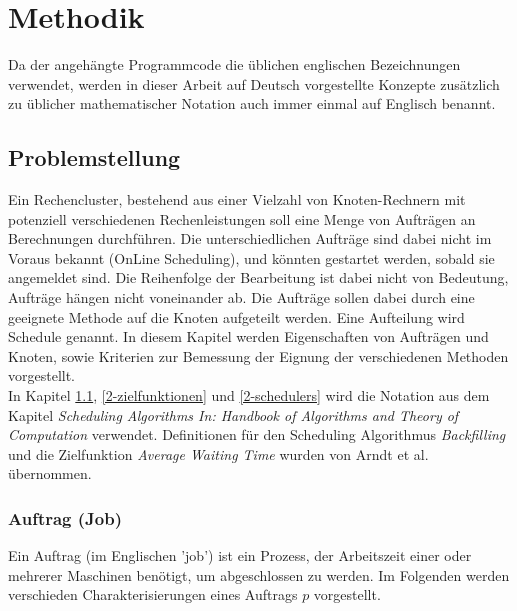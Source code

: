 \chapter{Methodik}
\label{chap:methodik}
Da der angehängte Programmcode die üblichen englischen Bezeichnungen verwendet, werden in dieser Arbeit auf Deutsch vorgestellte Konzepte zusätzlich zu üblicher mathematischer Notation auch immer einmal auf Englisch benannt.

\section{Problemstellung}
\label{2-problemstellung}

Ein Rechencluster, bestehend aus einer Vielzahl von Knoten-Rechnern mit potenziell verschiedenen Rechenleistungen soll eine Menge von Aufträgen an Berechnungen durchführen. Die unterschiedlichen Aufträge sind dabei nicht im Voraus bekannt (OnLine Scheduling), und könnten gestartet werden, sobald sie angemeldet sind. Die Reihenfolge der Bearbeitung ist dabei nicht von Bedeutung, Aufträge hängen nicht voneinander ab. Die Aufträge sollen dabei durch eine geeignete Methode auf die Knoten aufgeteilt werden. Eine Aufteilung wird Schedule genannt. In diesem Kapitel werden Eigenschaften von Aufträgen und Knoten, sowie Kriterien zur Bemessung der Eignung der verschiedenen Methoden vorgestellt.\\
In Kapitel \ref{2-problemstellung}, \ref{2-zielfunktionen} und \ref{2-schedulers} wird die Notation aus dem Kapitel \emph{Scheduling Algorithms In: Handbook of Algorithms and Theory of Computation} 
\cite[p.~7-21]{Kar97} verwendet. Definitionen für den Scheduling Algorithmus \emph{Backfilling} und die Zielfunktion \emph{Average Waiting Time} wurden von Arndt et al. \cite[p. 96,98]{Arn99} übernommen.


\subsection{Auftrag (Job)}
Ein Auftrag (im Englischen 'job') ist ein Prozess, der Arbeitszeit einer oder mehrerer Maschinen benötigt, um abgeschlossen zu werden. Im Folgenden werden verschieden Charakterisierungen eines Auftrags $p$ vorgestellt.

